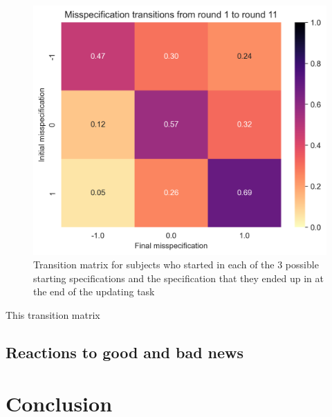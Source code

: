\documentclass[
  12pt,
]{article}
\begin{document}
\begin{figure}
\hypertarget{fig:transitions}{%
\centering
\includegraphics{../figures/misspecification_transitions.png}
\caption{Transition matrix for subjects who started in each of the 3
possible starting specifications and the specification that they ended
up in at the end of the updating task}\label{fig:transitions}
}
\end{figure}

This transition matrix

\hypertarget{reactions-to-good-and-bad-news}{%
\subsection{Reactions to good and bad
news}\label{reactions-to-good-and-bad-news}}

\hypertarget{conclusion}{%
\section{Conclusion}\label{conclusion}}

\renewcommand\refname{References}
  
\end{document}
